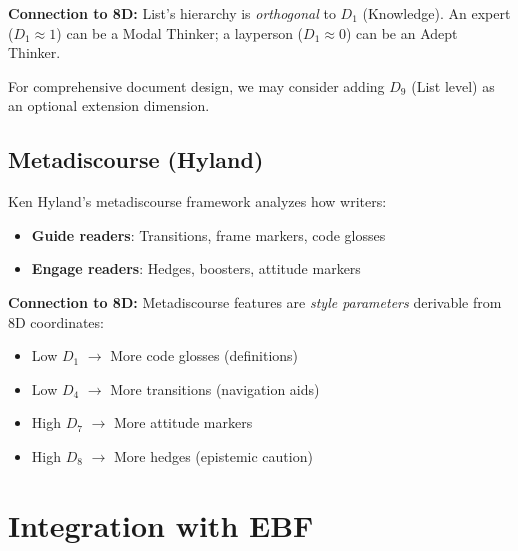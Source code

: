 \textbf{Connection to 8D:}
List's hierarchy is \textit{orthogonal} to $D_1$ (Knowledge).
An expert ($D_1 \approx 1$) can be a Modal Thinker;
a layperson ($D_1 \approx 0$) can be an Adept Thinker.

For comprehensive document design, we may consider adding $D_9$ (List level)
as an optional extension dimension.

\subsection{Metadiscourse (Hyland)}

Ken Hyland's metadiscourse framework \citep{hyland2005} analyzes how writers:

\begin{itemize}[nosep]
\item \textbf{Guide readers}: Transitions, frame markers, code glosses
\item \textbf{Engage readers}: Hedges, boosters, attitude markers
\end{itemize}

\textbf{Connection to 8D:}
Metadiscourse features are \textit{style parameters} derivable from 8D coordinates:
\begin{itemize}[nosep]
\item Low $D_1$ $\rightarrow$ More code glosses (definitions)
\item Low $D_4$ $\rightarrow$ More transitions (navigation aids)
\item High $D_7$ $\rightarrow$ More attitude markers
\item High $D_8$ $\rightarrow$ More hedges (epistemic caution)
\end{itemize}


\section{Integration with EBF}
\label{sec:doctype-theory-integration}

